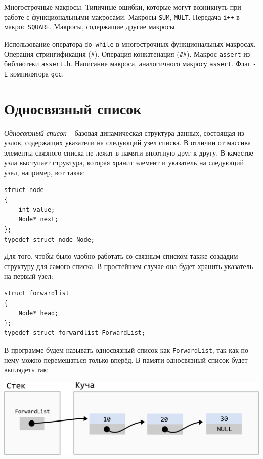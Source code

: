 \documentclass{article}
\begin{document}
Многострочные макросы. Типичные ошибки, которые
могут возникнуть при работе с функциональными макросами. 
Макросы \texttt{SUM}, \texttt{MULT}. Передача \texttt{i++} в макрос \texttt{SQUARE}.
Макросы, содержащие другие макросы.

Использование оператора \texttt{do while} в
многострочных функциональных макросах. Операция стрингификация (\texttt{\#}). Операция конкатенация (\texttt{\#\#}).
Макрос \texttt{assert} из библиотеки \texttt{assert.h}. Написание макроса, аналогичного макросу \texttt{assert}. Флаг \texttt{-E} компилятора \texttt{gcc}.

\newpage
\section*{Односвязный список}

\textit{Односвязный список} -- базовая динамическая структура данных, состоящая из узлов, содержащих указатели на следующий узел списка. В отличии от массива элементы связного списка не лежат в памяти вплотную друг к другу. В качестве узла выступает структура, которая хранит элемент и указатель на следующий узел, например, вот такая:
\begin{lstlisting}
struct node 
{
    int value;
    Node* next;
};
typedef struct node Node;
\end{lstlisting}

Для того, чтобы было удобно работать со связным списком также создадим структуру для самого списка. В простейшем случае она будет хранить указатель на первый узел:
\begin{lstlisting}
struct forwardlist 
{
    Node* head;
};
typedef struct forwardlist ForwardList;
\end{lstlisting}

В программе будем называть односвязный список как \texttt{ForwardList}, так как по нему можно перемещаться только вперёд. В памяти односвязный список будет выглядеть так:
\begin{center}
\includegraphics[scale=0.85]{../images/forward_list.png}
\end{center}
\end{document}
